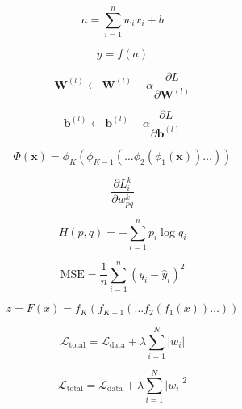 \documentclass{article}
\begin{document}
\begin{tcolorbox}[colback=pastelblue, colframe=pastelblue]
\begin{equation}
    a = \sum_{i=1}^{n} w_i x_i + b
\end{equation}
\end{tcolorbox}

\begin{tcolorbox}[colback=pastelpurple, colframe=pastelpurple]
\begin{equation}
    y = f(a)
\end{equation}
\end{tcolorbox}

\begin{equation}
\mathbf{W}^{(l)} \leftarrow \mathbf{W}^{(l)} - \alpha \frac{\partial L}{\partial \mathbf{W}^{(l)}}
\end{equation}

\begin{equation}
\mathbf{b}^{(l)} \leftarrow \mathbf{b}^{(l)} - \alpha \frac{\partial L}{\partial \mathbf{b}^{(l)}}
\end{equation}

\begin{equation}
\Phi(\boldsymbol{x})=\phi_K(\phi_{K-1}(\dots \phi_2(\phi_1(\boldsymbol{x}))\dots))
\end{equation}

\begin{equation}
\frac{\partial L_i^{k}}{\partial w_{pq}^{k}}
\end{equation}

\begin{equation}
H(p,q) = - \sum_{i=1}^{n} p_i \log q_i
\end{equation}

\begin{equation}
\text{MSE} = \frac{1}{n} \sum_{i=1}^{n} (y_i - \hat{y}_i)^2
\end{equation}

\begin{equation}
z = F(x) = f_K(f_{K-1}(\dots f_2(f_1(x))\dots))
\end{equation}

\begin{equation}
\mathcal{L}_{\text{total}} = \mathcal{L}_{\text{data}} + \lambda \sum_{i=1}^{N} \left| w_i \right|
\end{equation}

\begin{equation}
\mathcal{L}_{\text{total}} = \mathcal{L}_{\text{data}} + \lambda \sum_{i=1}^{N} \left| w_i \right|^2
\end{equation}
\end{document}
